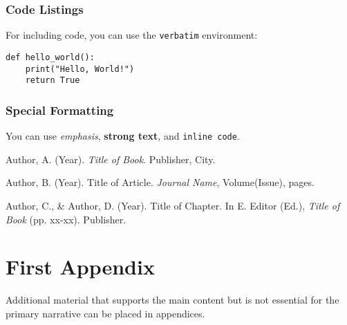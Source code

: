\documentclass[12pt,a4paper,oneside]{book}
\newcommand{\emphasis}[1]{\textit{#1}}
\newcommand{\strong}[1]{\textbf{#1}}
\newcommand{\code}[1]{\texttt{#1}}
\begin{document}
\subsection{Code Listings}

For including code, you can use the \code{verbatim} environment:

\begin{verbatim}
def hello_world():
    print("Hello, World!")
    return True
\end{verbatim}

\subsection{Special Formatting}

You can use \emphasis{emphasis}, \strong{strong text}, and \code{inline code}.


\backmatter

\begin{thebibliography}{99}

Author, A. (Year). \textit{Title of Book}. Publisher, City.

Author, B. (Year). Title of Article. \textit{Journal Name}, Volume(Issue), pages.

Author, C., \& Author, D. (Year). Title of Chapter. In E. Editor (Ed.), \textit{Title of Book} (pp. xx-xx). Publisher.

\end{thebibliography}

\appendix
\chapter{First Appendix}
\label{app:first}

Additional material that supports the main content but is not essential for the primary narrative can be placed in appendices.

\end{document}
